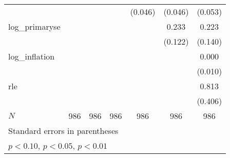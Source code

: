 {\begin{tabular}{l*{6}{c}}
            &                     &                     &                     &     (0.046)         &     (0.046)         &     (0.053)         \\
\addlinespace
log\_primaryse&                     &                     &                     &                     &       0.233\sym{*}  &       0.223         \\
            &                     &                     &                     &                     &     (0.122)         &     (0.140)         \\
\addlinespace
log\_inflation&                     &                     &                     &                     &                     &       0.000         \\
            &                     &                     &                     &                     &                     &     (0.010)         \\
\addlinespace
rle         &                     &                     &                     &                     &                     &       0.813\sym{**} \\
            &                     &                     &                     &                     &                     &     (0.406)         \\
\midrule
\(N\)       &         986         &         986         &         986         &         986         &         986         &         986         \\
\bottomrule
\multicolumn{7}{l}{\footnotesize Standard errors in parentheses}\\
\multicolumn{7}{l}{\footnotesize \sym{*} \(p<0.10\), \sym{**} \(p<0.05\), \sym{***} \(p<0.01\)}\\
\end{tabular}
}
